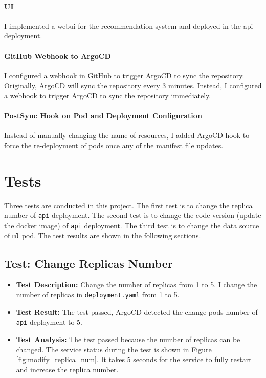 \documentclass[12pt]{article}
\begin{document}
\paragraph{UI}
I implemented a webui for the recommendation system and deployed in the api deployment.

\paragraph{GitHub Webhook to ArgoCD}
I configured a webhook in GitHub to trigger ArgoCD to sync the repository. Originally, ArgoCD will sync the repository every 3 minutes. Instead, I configured a webhook to trigger ArgoCD to sync the repository immediately.

\paragraph{PostSync Hook on Pod and Deployment Configuration}
Instead of manually changing the name of resources, I added ArgoCD hook to force the re-deployment of pods once any of the manifest file updates.

\section{Tests}

Three tests are conducted in this project. The first test is to change the replica number of \texttt{api} deployment. The second test is to change the code version (update the docker image) of \texttt{api} deployment. The third test is to change the data source of \texttt{ml} pod. The test results are shown in the following sections.

\subsection{Test: Change Replicas Number}

\begin{itemize}
    \item \textbf{Test Description:} Change the number of replicas from 1 to 5. I change the number of replicas in \texttt{deployment.yaml} from 1 to 5.
    \item \textbf{Test Result:} The test passed, ArgoCD detected the change pods number of \texttt{api} deployment to 5.
    \item \textbf{Test Analysis:} The test passed because the number of replicas can be changed. The service status during the test is shown in Figure \ref{fig:modify_replica_num}. It takes 5 seconds for the service to fully restart and increase the replica number.
\end{itemize}
\end{document}
